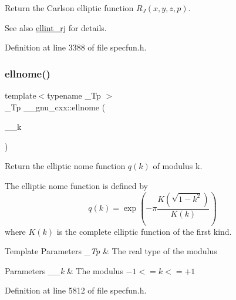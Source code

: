 Return the Carlson elliptic function $ R_J(x,y,z,p) $.

\begin{DoxySeeAlso}{See also}
\hyperlink{group__mathsf__gnu_gadccabc8df929cc03745286ed1574a3ba}{ellint\+\_\+rj} for details. 
\end{DoxySeeAlso}


Definition at line 3388 of file specfun.\+h.

\mbox{\label{group__mathsf__gnu_ga7bfb34f8b5c0ed7c72040f9cb7034bba}} 
\subsubsection{\texorpdfstring{ellnome()}{ellnome()}}
{\footnotesize\ttfamily template$<$typename \+\_\+\+Tp $>$ \\
\+\_\+\+Tp \+\_\+\+\_\+gnu\+\_\+cxx\+::ellnome (\begin{DoxyParamCaption}\item[{\+\_\+\+Tp}]{\+\_\+\+\_\+k }\end{DoxyParamCaption})\hspace{0.3cm}{\ttfamily [inline]}}

Return the elliptic nome function $ q(k) $ of modulus {\ttfamily k}.

The elliptic nome function is defined by \[ q(k) = \exp \left(-\pi\frac{K(\sqrt{1-k^2})}{K(k)} \right) \] where $ K(k) $ is the complete elliptic function of the first kind.


\begin{DoxyTemplParams}{Template Parameters}
{\em \+\_\+\+Tp} & The real type of the modulus \\
\hline
\end{DoxyTemplParams}

\begin{DoxyParams}{Parameters}
{\em \+\_\+\+\_\+k} & The modulus $ -1 <= k <= +1 $ \\
\hline
\end{DoxyParams}


Definition at line 5812 of file specfun.\+h.

\mbox{\label{group__mathsf__gnu_gad3ba08e5843ea0ec2bb9ddde3033adff}} 
